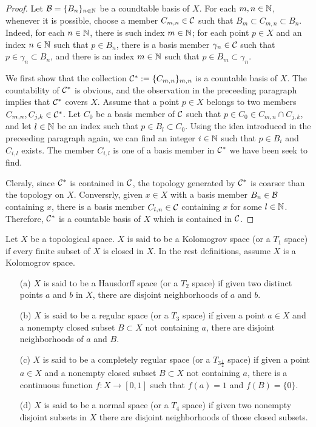 \begin{proof}
    Let ${\mathcal{B}}=\{B_n\}_{n\in{\mathbb{N}}}$ be a coundtable basis of $X$.
    For each $m, n\in{\mathbb{N}}$, whenever it is possible, choose a member $C_{m, n}\in{\mathcal{C}}$ such that $B_m\subset C_{m, n}\subset B_n$.
    Indeed, for each $n\in{\mathbb{N}}$, there is such index $m\in{\mathbb{N}}$; for each point $p\in X$ and an index $n\in{\mathbb{N}}$ such that $p\in B_n$, there is a basis member $\gamma_n\in{\mathcal{C}}$ such that $p\in\gamma_n\subset B_n$, and there is an index $m\in{\mathbb{N}}$ such that $p\in B_m\subset\gamma_n$.
    
    We first show that the collection ${\mathcal{C}}^*:=\{C_{m, n}\}_{m, n}$ is a countable basis of $X$.
    The countability of ${\mathcal{C}}^*$ is obvious, and the observation in the preceeding paragraph implies that ${\mathcal{C}}^*$ covers $X$.
    Assume that a point $p\in X$ belongs to two members $C_{m, n}, C_{j, k}\in{\mathcal{C}}^*$.
    Let $C_0$ be a basis member of ${\mathcal{C}}$ such that $p\in C_0\in C_{m, n}\cap C_{j, k}$, and let $l\in{\mathbb{N}}$ be an index such that $p\in B_l\subset C_0$.
    Using the idea introduced in the preceeding paragraph again, we can find an integer $i\in{\mathbb{N}}$ such that $p\in B_i$ and $C_{i, l}$ exists.
    The member $C_{i, l}$ is one of a basis member in ${\mathcal{C}}^*$ we have been seek to find.

    Cleraly, since ${\mathcal{C}}^*$ is contained in ${\mathcal{C}}$, the topology generated by ${\mathcal{C}}^*$ is coarser than the topology on $X$.
    Conversrly, given $x\in X$ with a basis member $B_n\in{\mathcal{B}}$ containing $x$, there is a basis member $C_{l, n}\in{\mathcal{C}}$ containing $x$ for some $l\in{\mathbb{N}}$.
    Therefore, ${\mathcal{C}}^*$ is a countable basis of $X$ which is contained in ${\mathcal{C}}$.
    \end{proof}
\begin{defi}
    Let $X$ be a topological space.
    $X$ is said to be a Kolomogrov space (or a $T_1$ space) if every finite subset of $X$ is closed in $X$.
    In the rest definitions, assume $X$ is a Kolomogrov space.
    \begin{enumerate}
        \item[(a)]
        {
            $X$ is said to be a Hausdorff space (or a $T_2$ space) if given two distinct points $a$ and $b$ in $X$, there are disjoint neighborhoods of $a$ and $b$.
        }
        \item[(b)]
        {
            $X$ is said to be a regular space (or a $T_3$ space) if given a point $a\in X$ and a nonempty closed subset $B\subset X$ not containing $a$, there are disjoint neighborhoods of $a$ and $B$.
        }
        \item[(c)]
        {
            $X$ is said to be a completely regular space (or a $T_{3\frac{1}{2}}$ space) if given a point $a\in X$ and a nonempty closed subset $B\subset X$ not containing $a$, there is a continuous function $f: X\rightarrow[0, 1]$ such that $f(a)=1$ and $f(B)=\{0\}$.
        }
        \item[(d)]
        {
            $X$ is said to be a normal space (or a $T_4$ space) if given two nonempty disjoint subsets in $X$ there are disjoint neighborhoods of those closed subsets.
        }
    \end{enumerate}
\end{defi}
